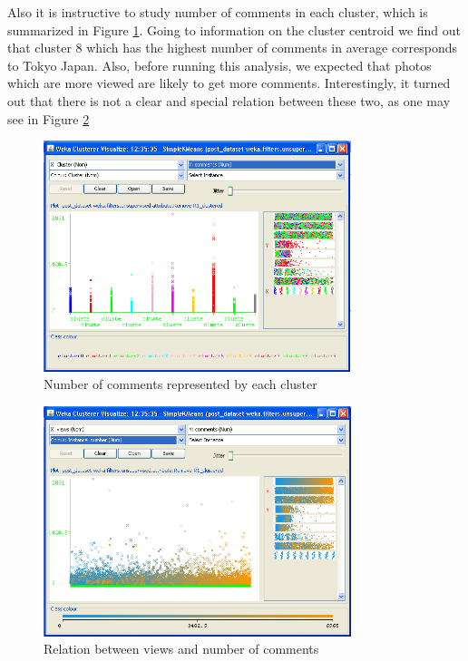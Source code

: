 \documentclass[letter,12pt]{article}
\begin{document}
Also it is instructive to study number of comments in each cluster,
which is summarized in Figure \ref{Flo:clus_comm}. Going to information
on the cluster centroid we find out that cluster 8 which has the
highest number of comments in average corresponds to Tokyo Japan.
Also, before running this analysis, we expected that photos which
are more viewed are likely to get more comments. Interestingly, it
turned out that there is not a clear and special relation between
these two, as one may see in Figure \ref{Flo:com_view}


\begin{figure}
\centering
\includegraphics[width=0.8\textwidth]{clusno_comm.png}
\caption{Number of comments represented by each cluster}
\label{Flo:clus_comm}
\end{figure}


\begin{figure}
\centering
\includegraphics[width=0.8\textwidth]{comm_vew.png}
\caption{Relation between views and number of comments}
\label{Flo:com_view}
\end{figure}
\end{document}
